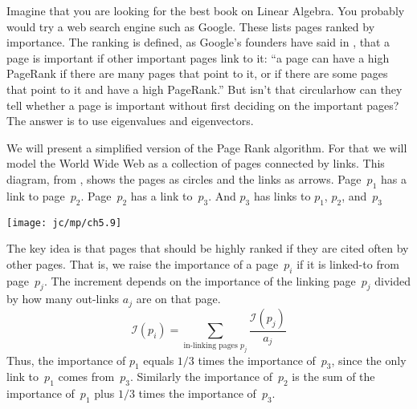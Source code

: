 
Imagine that you are looking for the best book
on Linear Algebra.
You probably would try a web search engine such as Google.
These lists pages ranked by importance.
The ranking is defined, as Google's founders have said in \cite{BrinPage}, 
that a page is important if other important
pages link to it:
``a page can have a high PageRank if there are many pages that point
to it, or if there are some pages that point to it and have a high PageRank.''
But isn't that circular\Dash how can they tell whether a page is
important without first deciding on the important pages?
The answer is to use eigenvalues and eigenvectors.

We will present a simplified version of the Page Rank algorithm. 
For that we will model the World Wide Web as a collection of pages connected by
links.
This diagram, from \cite{Wills},
shows the pages as circles and the links as arrows.
Page~$p_1$ has a link to page~$p_2$.
Page~$p_2$ has a link to~$p_3$.
And $p_3$ has links to $p_1$, $p_2$, and~$p_3$ 
\begin{center} 
  \texttt{[image: jc/mp/ch5.9]}
\end{center}

The key idea is that pages that should be highly ranked if they are
cited often by other pages.
That is, we raise the importance of a page~$p_i$
if it is linked-to from page~$p_j$.
The increment depends on the importance of the linking page~$p_j$
divided by how many out-links $a_j$ are on that page.
\begin{equation*}
  \mathcal{I}(p_i)=\sum_{\text{in-linking pages $p_j$}}  \frac{\mathcal{I}(p_j)}{a_j}
\end{equation*}
Thus, the importance of $p_1$ equals $1/3$ times the importance of~$p_3$,
since the only link to~$p_1$ comes from~$p_3$.
Similarly the importance of~$p_2$ is the sum of the
importance of~$p_1$ plus $1/3$ times the importance of~$p_3$.

